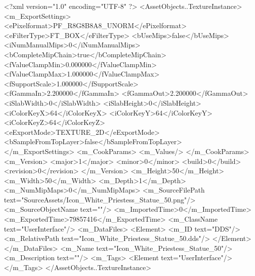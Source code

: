 <?xml version="1.0" encoding="UTF-8" ?>
<AssetObjects..TextureInstance>
	<m_ExportSettings>
		<ePixelformat>PF_R8G8B8A8_UNORM</ePixelformat>
		<eFilterType>FT_BOX</eFilterType>
		<bUseMips>false</bUseMips>
		<iNumManualMips>0</iNumManualMips>
		<bCompleteMipChain>true</bCompleteMipChain>
		<fValueClampMin>0.000000</fValueClampMin>
		<fValueClampMax>1.000000</fValueClampMax>
		<fSupportScale>1.000000</fSupportScale>
		<fGammaIn>2.200000</fGammaIn>
		<fGammaOut>2.200000</fGammaOut>
		<iSlabWidth>0</iSlabWidth>
		<iSlabHeight>0</iSlabHeight>
		<iColorKeyX>64</iColorKeyX>
		<iColorKeyY>64</iColorKeyY>
		<iColorKeyZ>64</iColorKeyZ>
		<eExportMode>TEXTURE_2D</eExportMode>
		<bSampleFromTopLayer>false</bSampleFromTopLayer>
	</m_ExportSettings>
	<m_CookParams>
		<m_Values/>
	</m_CookParams>
	<m_Version>
		<major>1</major>
		<minor>0</minor>
		<build>0</build>
		<revision>0</revision>
	</m_Version>
	<m_Height>50</m_Height>
	<m_Width>50</m_Width>
	<m_Depth>1</m_Depth>
	<m_NumMipMaps>0</m_NumMipMaps>
	<m_SourceFilePath text="SourceAssets/Icon_White_Priestess_Statue_50.png"/>
	<m_SourceObjectName text=""/>
	<m_ImportedTime>0</m_ImportedTime>
	<m_ExportedTime>79857416</m_ExportedTime>
	<m_ClassName text="UserInterface"/>
	<m_DataFiles>
		<Element>
			<m_ID text="DDS"/>
			<m_RelativePath text="Icon_White_Priestess_Statue_50.dds"/>
		</Element>
	</m_DataFiles>
	<m_Name text="Icon_White_Priestess_Statue_50"/>
	<m_Description text=""/>
	<m_Tags>
		<Element text="UserInterface"/>
	</m_Tags>
</AssetObjects..TextureInstance>
